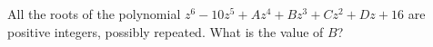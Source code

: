 All the roots of the polynomial $z^6-10z^5+Az^4+Bz^3+Cz^2+Dz+16$ are positive integers, possibly repeated. What is the value of $B$?
